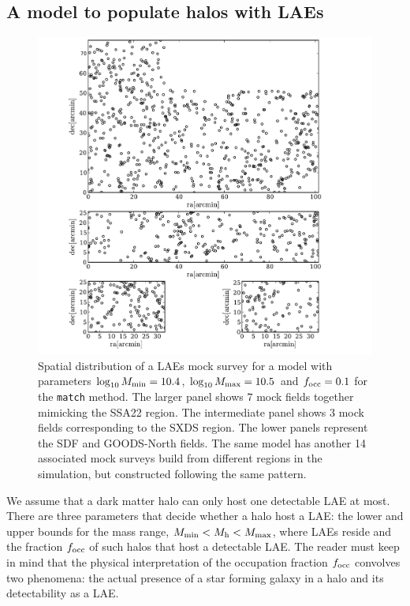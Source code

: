 \documentclass[usenatbib]{mn2e}
\begin{document}
\subsection{A model to populate halos with LAEs}
\label{subsec:mocks}



\begin{figure}
\begin{center}
\includegraphics[width=0.8\linewidth,angle=0]{Figure0.pdf}
\caption{ \label{fig:distros} Spatial distribution of a LAEs mock
  survey for a model with parameters $\log_{10}M_{\rm min}=10.4$, $\log_{10}M_{\rm
    max}=10.5$ and $f_{\rm occ}=0.1$ for the {\texttt{match}}
  method. The larger panel shows $7$ mock
  fields together mimicking the SSA22 region. The intermediate panel
  shows $3$ mock fields corresponding to the SXDS region. The lower
  panels represent the SDF and GOODS-North fields. The same model has
  another 14 associated mock surveys build from different regions in
  the simulation, but constructed following the same pattern.}
\end{center} 
\end{figure}


We assume that a dark matter halo can only host one
detectable LAE at most.  There are three parameters that
decide whether a halo host a LAE: the lower and upper bounds for the
mass range, $M_{\rm min}< M_{\rm h} < M_{\rm max}$, where LAEs reside and the fraction $f_{\rm occ}$ of such halos that host a detectable LAE. The reader
must keep in mind that the physical interpretation of the occupation
fraction $f_{\rm occ}$ convolves two phenomena: the actual presence of a star
forming galaxy in a halo and its detectability as a LAE.
\end{document}
